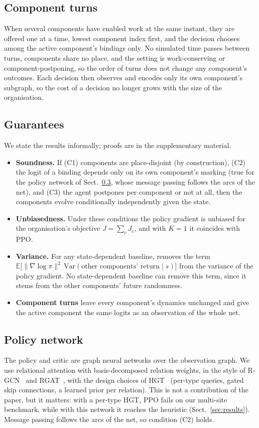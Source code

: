 \subsection{Component turns}\label{sec:turns}
When several components have enabled work at the same instant, they are offered one at
a time, lowest component index first, and the decision chooses among the active
component's bindings only. No simulated time passes between turns, components share no
place, and the setting is work-conserving or component-postponing, so the order of turns
does not change any component's outcomes. Each decision then observes and encodes only
its own component's subgraph, so the cost of a decision no longer grows with the size of
the organisation.

\subsection{Guarantees}\label{sec:guarantees}
We state the results informally; proofs are in the supplementary material.

\noindent{}
\begin{itemize}
  \item \textbf{Soundness.} If (C1) components are place-disjoint (by construction),
    (C2) the logit of a binding depends only on its own component's marking (true for
    the policy network of Sect.~\ref{sec:network}, whose message passing follows the
    arcs of the net), and (C3) the agent postpones per component or not at all, then
    the components evolve conditionally independently given the state.
  \item \textbf{Unbiasedness.} Under these conditions the \nfgae{} policy gradient is
    unbiased for the organisation's objective $J=\sum_c J_c$, and with $K=1$ it
    coincides with PPO.
  \item \textbf{Variance.} For any state-dependent baseline, \nfgae{} removes the term
    $\mathbb{E}\big[\lVert\nabla\log\pi\rVert^2\,\mathrm{Var}(\text{other components'
    return}\mid s)\big]$ from the variance of the policy gradient. No state-dependent
    baseline can remove this term, since it stems from the other components' future
    randomness.
  \item \textbf{Component turns} leave every component's dynamics unchanged and give the
    active component the same logits as an observation of the whole net.
\end{itemize}

\subsection{Policy network}\label{sec:network}
The policy and critic are graph neural networks over the observation graph. We use
relational attention with basis-decomposed relation weights, in the style of
R-GCN~\cite{rgcn2018} and RGAT~\cite{rgat2019}, with the design choices of
HGT~\cite{hu2020hgt} (per-type queries, gated skip connections, a learned prior per
relation). This is not a contribution of the paper, but it matters: with a per-type
HGT, PPO fails on our multi-site benchmark, while with this network it reaches the
heuristic (Sect.~\ref{sec:results}). Message passing follows the arcs of the net, so
condition (C2) holds.

